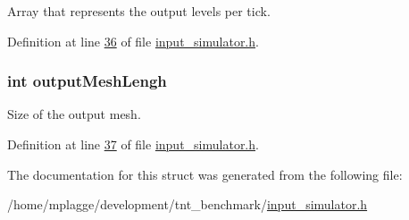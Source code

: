 Array that represents the output levels per tick. 



Definition at line \hyperlink{input__simulator_8h_source_l00036}{36} of file \hyperlink{input__simulator_8h_source}{input\+\_\+simulator.\+h}.

\hypertarget{structselected_spikes_a97727a3be0dbd5813f860c99733048a8}{}
\subsubsection[{output\+Mesh\+Lengh}]{\setlength{\rightskip}{0pt plus 5cm}int output\+Mesh\+Lengh}\label{structselected_spikes_a97727a3be0dbd5813f860c99733048a8}


Size of the output mesh. 



Definition at line \hyperlink{input__simulator_8h_source_l00037}{37} of file \hyperlink{input__simulator_8h_source}{input\+\_\+simulator.\+h}.



The documentation for this struct was generated from the following file\+:\begin{DoxyCompactItemize}
\item 
/home/mplagge/development/tnt\+\_\+benchmark/\hyperlink{input__simulator_8h}{input\+\_\+simulator.\+h}\end{DoxyCompactItemize}
